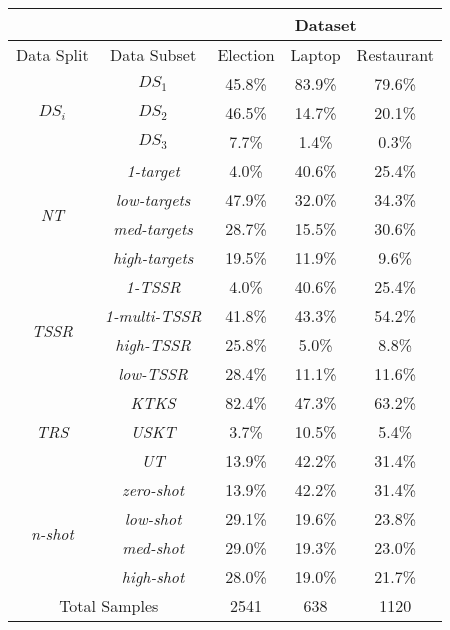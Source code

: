 \begin{tabular}{|c|c|c|c|c|}
\hline
    &    & \multicolumn{3}{c|}{Dataset} \\
\hline
Data Split & Data Subset &  Election &  Laptop &  Restaurant \\
\hline
\multirow{3}{*}{$DS_i$} & $DS_1$ &      45.8\% &    83.9\% &        79.6\% \\
 & $DS_2$ &      46.5\% &    14.7\% &        20.1\% \\
 & $DS_3$ &       7.7\% &     1.4\% &         0.3\% \\
\hline
 \multirow{4}{*}{\textit{NT}} & \textit{1-target} &       4.0\% &    40.6\% &        25.4\% \\
 & \textit{low-targets} &      47.9\% &    32.0\% &        34.3\% \\
 & \textit{med-targets} &      28.7\% &    15.5\% &        30.6\% \\
 & \textit{high-targets} &      19.5\% &    11.9\% &         9.6\% \\
\hline
 \multirow{4}{*}{\textit{TSSR}} & \textit{1-TSSR} &       4.0\% &    40.6\% &        25.4\% \\
 & \textit{1-multi-TSSR} &      41.8\% &    43.3\% &        54.2\% \\
 & \textit{high-TSSR} &      25.8\% &    5.0\% &         8.8\% \\
 & \textit{low-TSSR} &      28.4\% &    11.1\% &        11.6\% \\
 \hline
 \multirow{3}{*}{\textit{TRS}} & \textit{KTKS} &      82.4\% &    47.3\% &        63.2\% \\
 & \textit{USKT} &       3.7\% &    10.5\% &         5.4\% \\
 & \textit{UT} &      13.9\% &    42.2\% &        31.4\% \\
\hline
 \multirow{4}{*}{\textit{n-shot}} & \textit{zero-shot} &      13.9\% &    42.2\% &        31.4\% \\
 & \textit{low-shot} &      29.1\% &    19.6\% &        23.8\% \\
 & \textit{med-shot} &      29.0\% &    19.3\% &        23.0\% \\
 & \textit{high-shot} &      28.0\% &    19.0\% &        21.7\% \\
\hline
 \multicolumn{2}{|c|}{Total Samples}           &    2541 &  638 &      1120 \\
\hline
 \end{tabular}